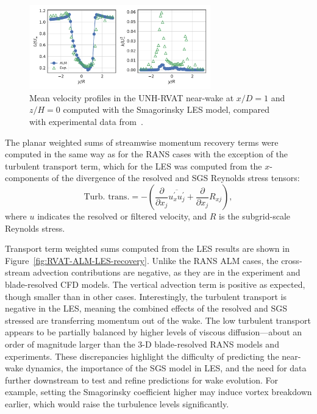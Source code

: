 \documentclass[times]{weauth}
\begin{document}
\begin{figure}
    \centering

    \includegraphics[width=0.7\textwidth]{RVAT-ALM-LES_wake-profiles}

    \caption{Mean velocity profiles in the UNH-RVAT near-wake at $x/D=1$ and
        $z/H=0$ computed with the Smagorinsky LES model, compared with experimental
        data from~\cite{Bachant2016-RVAT-Re-dep}.}

    \label{fig:RVAT-ALM-LES-profiles}
\end{figure}

The planar weighted sums of streamwise momentum recovery terms were computed in
the same way as for the RANS cases with the exception of the turbulent transport
term, which for the LES was computed from the $x$-components of the divergence
of the resolved and SGS Reynolds stress tensors:
\begin{equation}
    \text{Turb. trans.} = - \left( \frac{\partial}{\partial x_j}
    \overline{u^\prime_x u^\prime_j}
    + \frac{\partial}{\partial x_j} R_{xj}
    \right),
\end{equation}
where $u$ indicates the resolved or filtered velocity, and $R$ is the
subgrid-scale Reynolds stress.

Transport term weighted sums computed from the LES results are shown in
Figure~\ref{fig:RVAT-ALM-LES-recovery}. Unlike the RANS ALM cases, the
cross-stream advection contributions are negative, as they are in the experiment
and blade-resolved CFD models. The vertical advection term is positive as
expected, though smaller than in other cases. Interestingly, the turbulent
transport is negative in the LES, meaning the combined effects of the resolved
and SGS stressed are transferring momentum out of the wake. The low turbulent
transport appears to be partially balanced by higher levels of viscous
diffusion---about an order of magnitude larger than the 3-D blade-resolved RANS
models and experiments. These discrepancies highlight the difficulty of
predicting the near-wake dynamics, the importance of the SGS model in LES, and
the need for data further downstream to test and refine predictions for wake
evolution. For example, setting the Smagorinsky coefficient higher may induce
vortex breakdown earlier, which would raise the turbulence levels significantly.
\end{document}
